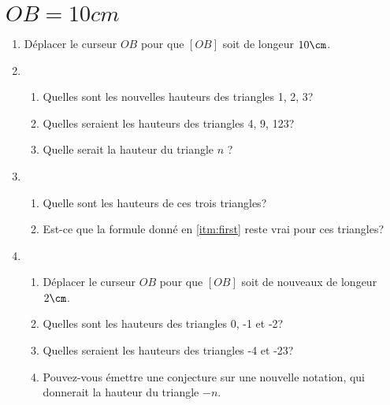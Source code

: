 \section{$OB = 10cm$}

\begin{enumerate}\setlength{\itemsep}{15pt}%
    \item Déplacer le curseur $OB$ pour que $[OB]$ soit de longeur $10\cm$.
    \item \begin{enumerate} \item Quelles sont les nouvelles hauteurs des triangles 1, 2, 3?
            \item Quelles seraient les hauteurs des triangles 4, 9, 123?
            \item \label{itm:first} Quelle serait la hauteur du triangle $n$ ?
    \end{enumerate}
    \item \begin{enumerate} 
        \item Quelle sont les hauteurs de ces trois triangles?
        \item Est-ce que la formule donné en \ref{itm:first} reste vrai pour ces triangles?
    \end{enumerate}
    \item \begin{enumerate}
        \item Déplacer le curseur $OB$ pour que $[OB]$ soit de nouveaux de longeur $2\cm$.
        \item Quelles sont les hauteurs des triangles 0, -1 et -2?
        \item Quelles seraient les hauteurs des triangles -4 et -23?
        \item Pouvez-vous émettre une conjecture sur une nouvelle notation,
        qui donnerait la hauteur du triangle $-n$.
    \end{enumerate}
\end{enumerate}